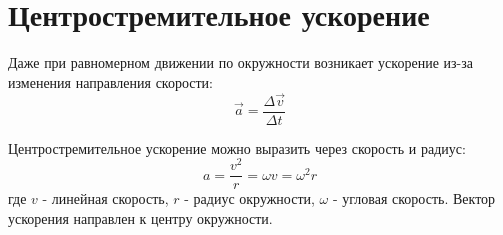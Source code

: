 \documentclass{article}
\begin{document}
\section*{Центростремительное ускорение}

Даже при равномерном движении по окружности возникает ускорение из-за изменения направления скорости:
\[
\vec a = \frac{\Delta\vec v}{\Delta t}
\]

Центростремительное ускорение можно выразить через скорость и радиус:
\[
a = \frac{v^2}{r} = \omega v = \omega^2 r
\]
где $v$ - линейная скорость, $r$ - радиус окружности, $\omega$ - угловая скорость. Вектор ускорения направлен к центру окружности.
\end{document}
